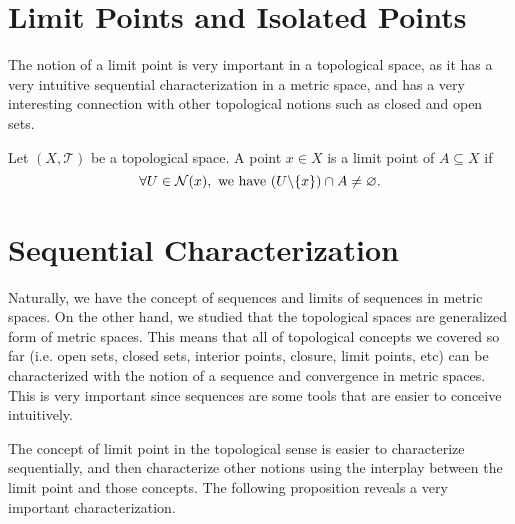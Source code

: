 \section{Limit Points and Isolated Points}
The notion of a limit point is very important in a topological space, as it has a very intuitive sequential characterization in a metric space, and has a very interesting connection with other topological notions such as closed and open sets.

\begin{definition}
	Let $(X,\mathcal{T})$ be a topological space. A point $x \in X$ is a limit point of $A \subseteq X$ if 
	\[ \forall U \in \mathcal{N}(x), \ \text{we have}\  (U\backslash\{x\}) \cap A \neq \varnothing.  \]
\end{definition}


\section{Sequential Characterization}
Naturally, we have the concept of sequences and limits of sequences in metric spaces. On the other hand, we studied that the topological spaces are generalized form of metric spaces. This means that all of topological concepts we covered so far (i.e. open sets, closed sets, interior points, closure, limit points, etc) can be characterized with the notion of a sequence and convergence in metric spaces. This is very important since sequences are some tools that are easier to conceive intuitively. 

The concept of limit point in the topological sense is easier to characterize sequentially, and then characterize other notions using the interplay between the limit point and those concepts. The following proposition reveals a very important characterization.


